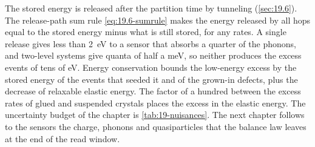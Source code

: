 The stored energy is released after the partition time by tunneling (\cref{sec:19.6}). The release-path sum rule \cref{eq:19.6-sumrule} makes the energy released by all hops equal to the stored energy minus what is still stored, for any rates. A single release gives less than \SI{2}{eV} to a sensor that absorbs a quarter of the phonons, and two-level systems give quanta of half a meV, so neither produces the excess events of tens of eV. Energy conservation bounds the low-energy excess by the stored energy of the events that seeded it and of the grown-in defects, plus the decrease of relaxable elastic energy. The factor of a hundred between the excess rates of glued and suspended crystals places the excess in the elastic energy. The uncertainty budget of the chapter is \cref{tab:19-nuisances}. The next chapter follows to the sensors the charge, phonons and quasiparticles that the balance law leaves at the end of the read window.
